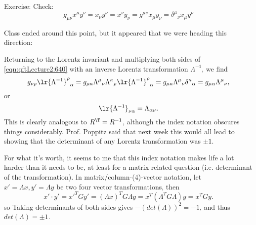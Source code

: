 Exercise: Check:
\begin{dmath}\label{eqn:qftLecture2:740}
g_{\mu\nu} x^\mu y^\nu = x_\nu y^\nu = x^\nu y_\nu
= g^{\mu\nu} x_\mu y_\nu = {\delta^\mu}_\nu x_\mu y^\nu
\end{dmath}

Class ended around this point, but it appeared that we were heading this direction:

Returning to the Lorentz invariant and multiplying both sides of
\cref{eqn:qftLecture2:640} with an inverse Lorentz transformation \( \Lambda^{-1} \), we find
\begin{dmath}\label{eqn:qftLecture2:760}
g_{\nu\rho}
{\lr{\Lambda^{-1}}^\rho}_\alpha
=
g_{\mu \kappa}
{\Lambda^\mu}_\nu
{\Lambda^\kappa}_\rho
{\lr{\Lambda^{-1}}^\rho}_\alpha
=
g_{\mu \kappa}
{\Lambda^\mu}_\nu
{\delta^\kappa}_\alpha
=
g_{\mu \alpha}
{\Lambda^\mu}_\nu,
\end{dmath}
or
\begin{dmath}\label{eqn:qftLecture2:780}
\lr{\Lambda^{-1}}_{\nu \alpha} = \Lambda_{\alpha \nu}.
\end{dmath}
This is clearly analogous to \( R^\T = R^{-1} \), although the index notation obscures things considerably.  Prof. Poppitz said that next week this would all lead to showing that the determinant of any Lorentz transformation was \( \pm 1 \).

For what it's worth, it seems to me that this index notation makes life a lot harder than it needs to be, at least for a matrix related question (i.e. determinant of the transformation).  In matrix/column-(4)-vector notation, let \(x' = \Lambda x, y' = \Lambda y\) be two four vector transformations, then
\begin{dmath}\label{eqn:qftLecture2:800}
x' \cdot y' = {x'}^T G y' = (\Lambda x)^T G \Lambda y = x^T ( \Lambda^T G \Lambda) y = x^T G y.
\end{dmath}
so
Taking determinants of both sides gives \(-(det(\Lambda))^2 = -1\), and thus \(det(\Lambda) = \pm 1\).
